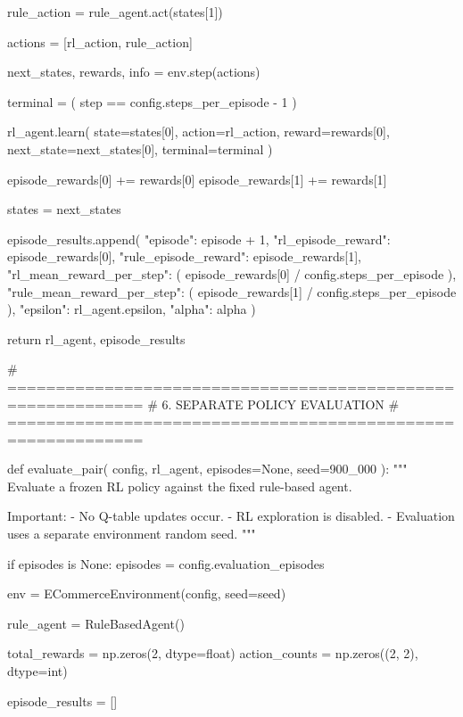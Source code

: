             rule_action = rule_agent.act(states[1])

            actions = [rl_action, rule_action]

            next_states, rewards, info = env.step(actions)

            terminal = (
                step == config.steps_per_episode - 1
            )

            rl_agent.learn(
                state=states[0],
                action=rl_action,
                reward=rewards[0],
                next_state=next_states[0],
                terminal=terminal
            )

            episode_rewards[0] += rewards[0]
            episode_rewards[1] += rewards[1]

            states = next_states

        episode_results.append({
            "episode": episode + 1,
            "rl_episode_reward": episode_rewards[0],
            "rule_episode_reward": episode_rewards[1],
            "rl_mean_reward_per_step": (
                episode_rewards[0]
                / config.steps_per_episode
            ),
            "rule_mean_reward_per_step": (
                episode_rewards[1]
                / config.steps_per_episode
            ),
            "epsilon": rl_agent.epsilon,
            "alpha": alpha
        })

    return rl_agent, episode_results


# ============================================================
# 6. SEPARATE POLICY EVALUATION
# ============================================================

def evaluate_pair(
    config,
    rl_agent,
    episodes=None,
    seed=900_000
):
    """
    Evaluate a frozen RL policy against the fixed rule-based agent.

    Important:
        - No Q-table updates occur.
        - RL exploration is disabled.
        - Evaluation uses a separate environment random seed.
    """

    if episodes is None:
        episodes = config.evaluation_episodes

    env = ECommerceEnvironment(config, seed=seed)

    rule_agent = RuleBasedAgent()

    total_rewards = np.zeros(2, dtype=float)
    action_counts = np.zeros((2, 2), dtype=int)

    episode_results = []


